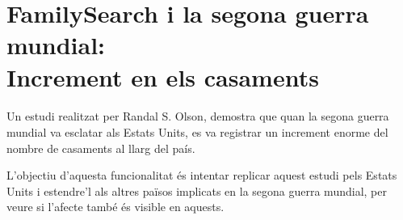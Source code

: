 \section{FamilySearch i la segona guerra mundial:\\Increment en els casaments}

    \paragraph{}
    Un estudi realitzat per Randal S. Olson, demostra que quan la segona guerra mundial va esclatar als Estats Units, es va registrar un increment enorme del nombre de casaments al llarg del país.

    L'objectiu d'aquesta funcionalitat és intentar replicar aquest estudi pels Estats Units i estendre'l als altres països implicats en la segona guerra mundial, per veure si l'afecte també és visible en aquests.

